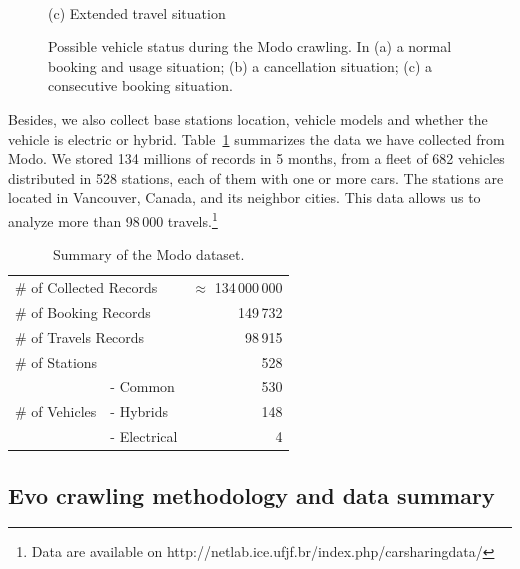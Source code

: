 \begin{figure}[!htb]
\begin{minipage}[b]{0.32\columnwidth}
     {\\(c) Extended travel situation}
    \end{minipage}
    \caption{Possible vehicle status during the Modo crawling. In (a) a normal booking and usage situation; (b) a cancellation situation; (c) a consecutive booking situation.}
    \label{fig:4_3_capturas}
\end{figure}

Besides, we also collect base stations location, vehicle models and whether the vehicle is electric or hybrid. 
Table~\ref{table:4_3_dataModo} summarizes the data we have collected from Modo. We stored 134 millions of records in 5 months, from a fleet of 682 vehicles distributed in 528 stations, each of them with one or more cars. The stations are located in Vancouver, Canada, and its neighbor cities. This data allows us to analyze more than %
98\,000 travels.\footnote{Data are available on http://netlab.ice.ufjf.br/index.php/carsharingdata/}

\begin{table}[tbh]
	\setlength{\tabcolsep}{2.3pt}
	\centering
		\begin{tabular}{llr}
		\hline
		\multicolumn{2}{l}{\# of Collected Records}  & $\approx$ 134\,000\,000\\
		\multicolumn{2}{l}{\# of Booking Records} & 149\,732  \\
		\multicolumn{2}{l}{\# of Travels Records} & 98\,915   \\
		\multicolumn{2}{l}{\# of Stations} & 528    \\\hline   
		\multirow{3}{*}{\# of Vehicles}       & - Common    & 530 \\
		                                      & - Hybrids  & 148 \\
		                                      & - Electrical & 4 \\
		                                      \hline
		\end{tabular}
	\caption{Summary of the Modo dataset.}
	\label{table:4_3_dataModo}
\end{table}



\subsection{Evo crawling methodology and data summary}

